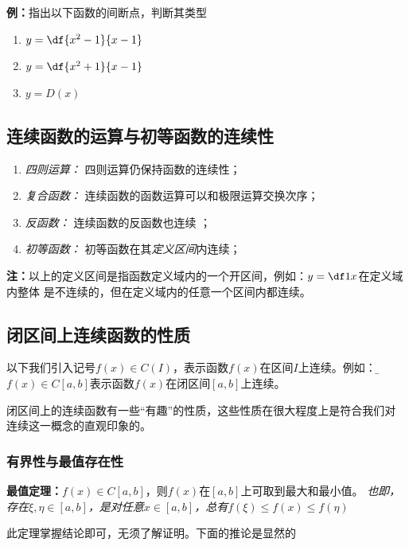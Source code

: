 {\bf 例：}指出以下函数的间断点，判断其类型
\begin{enumerate}[(1)]
  \setlength{\itemindent}{1cm}
  \item $y=\df{x^2-1}{x-1}$
  \item $y=\df{x^2+1}{x-1}$
  \item $y=D(x)$
\end{enumerate}

\subsection{连续函数的运算与初等函数的连续性}

\begin{enumerate}[(1)]
  \setlength{\itemindent}{1cm}
  \item {\it 四则运算：} 四则运算仍保持函数的连续性； 
  \item {\it 复合函数：} 连续函数的函数运算可以和极限运算交换次序； 
  \item {\it 反函数：} 连续函数的反函数也连续 ；
  \item {\it 初等函数：} 初等函数在其{\it 定义区间}内连续；
\end{enumerate}

{\bf 注：}以上的定义区间是指函数定义域内的一个开区间，例如：$y=\df1x$在定义域内整体
是不连续的，但在定义域内的任意一个区间内都连续。

\subsection{闭区间上连续函数的性质}

以下我们引入记号$f(x)\in C(I)$，表示函数$f(x)$在区间$I$上连续。例如：
{\b$f(x)\in C[a,b]$表示函数$f(x)$在闭区间$[a,b]$上连续}。

闭区间上的连续函数有一些“有趣”的性质，这些性质在很大程度上是符合我们对
连续这一概念的直观印象的。

\subsubsection{有界性与最值存在性}

\begin{thx}
	{\bf 最值定理：}$f(x)\in C[a,b]$，则$f(x)$在$[a,b]$上可取到最大和最小值。
	{\it 也即，存在$\xi,\eta\in[a,b]$，是对任意$x\in[a,b]$，总有$f(\xi)
	\leq f(x)\leq f(\eta)$}
\end{thx}

此定理掌握结论即可，无须了解证明。下面的推论是显然的

